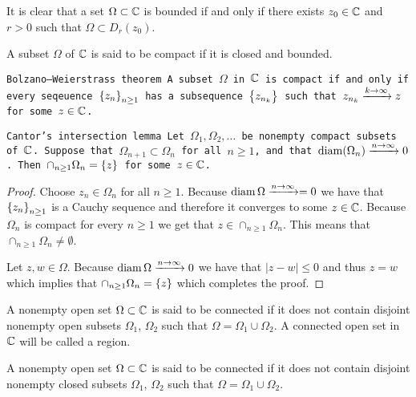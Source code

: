 \documentclass[11pt,a4paper]{article}
\begin{document}
\begin{remark}
  It is clear that a set $\Omega \subset \mathbb{C}$ is bounded if and only if
  there exists $z_0 \in \mathbb{C}$ and $r > 0$ such that $\Omega \subset D_r(z_0)$.
\end{remark}

\begin{definition}
  A subset $\Omega$ of $\mathbb{C}$ is said to be compact if it is closed and 
  bounded.
\end{definition}

\begin{theorem}\tt{Bolzano--Weierstrass theorem}
  A subset $\Omega$ in $\mathbb{C}$ is compact if and only if every seqeuence
  $\set{z_n}_{n \geq 1}$ has a subsequence $\set{z_{n_k}}$ such that
  $z_{n_k} \xrightarrow{k \to \infty} z$ for some $z \in \mathbb{C}$.
\end{theorem}

\begin{theorem}\tt{Cantor's intersection lemma}
  Let $\Omega_1, \Omega_2, \dots$ be nonempty compact subsets of $\mathbb{C}$.
  Suppose that $\Omega_{n+1} \subset \Omega_n$ for all $n \geq 1$,
  and that $\operatorname{diam}(\Omega_n) \xrightarrow{n \to \infty} 0$.
  Then $\cap_{n \geq 1} \Omega_n = \set{z}$ for some $z \in \mathbb{C}$.
\end{theorem}
\begin{proof}
  Choose $z_n \in \Omega_n$ for all $n \geq 1$.
  Because $\operatorname{diam} \Omega \xrightarrow{n \to \infty} = 0$ we have that
  $\set{z_n}_{n \geq 1}$ is a Cauchy sequence and therefore it converges
  to some $z \in \mathbb{C}$. Because $\Omega_n$ is compact for every $n \geq 1$
  we get that $z \in \cap_{n \geq 1} \Omega_n$.
  This means that $\cap_{n \geq 1} \Omega_n \neq \emptyset$.

  Let $z,w \in \Omega$.
  Because $\operatorname{diam} \Omega \xrightarrow{n \to \infty} 0$ we have that
  $|z - w| \le 0$ and thus $z = w$ which implies that
  $\cap_{n \geq 1} \Omega_n = \set{z}$ which completes the proof.
\end{proof}

\begin{definition}
  A nonempty open set $\Omega \subset \mathbb{C}$ is said to be connected if it does
  not contain disjoint nonempty open subsets $\Omega_1$, $\Omega_2$ such
  that $\Omega = \Omega_1 \cup \Omega_2$. A connected open set in 
  $\mathbb{C}$ will be called a region.
\end{definition}

\begin{definition}
  A nonempty open set $\Omega \subset \mathbb{C}$ is said to be connected if it does
  not contain disjoint nonempty closed subsets $\Omega_1$, $\Omega_2$ such
  that $\Omega = \Omega_1 \cup \Omega_2$.
\end{definition}
\end{document}
